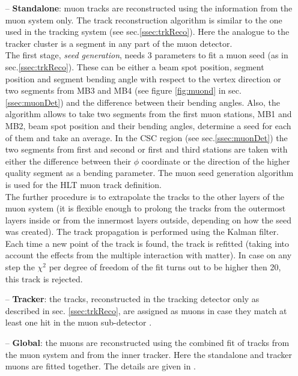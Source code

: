 \begin{itemize}
 \item [--] \textbf{Standalone}: muon tracks are reconstructed using the information from the muon system only. The track reconstruction
 algorithm \cite{TWiki:GlobalMuon} is similar to the one used in the tracking system (see sec.\ref{ssec:trkReco}). Here the analogue to the
 tracker cluster is a segment in any part of the muon detector.
 \\
 The first stage, \textit{seed generation}, needs 3 parameters to fit a muon seed (as in sec.\ref{ssec:trkReco}). These can be either a beam spot position, segment position and segment
 bending angle with respect to the vertex direction or two segments from MB3 and MB4 (see figure \ref{fig:muond} in sec.\ref{ssec:muonDet}) and the difference
 between their bending angles. Also, the algorithm allows to take two segments from the first muon stations, MB1 and MB2, beam spot position and their
 bending angles, determine a seed for each of them and take an average. In the CSC region (see sec.\ref{ssec:muonDet}) the two segments from first and second
 or first and third stations are taken with either the difference between their $\phi$ coordinate or the direction of the higher quality segment as a bending parameter.
 The muon seed generation algorithm is used for the HLT muon track definition.
 \\
 The further procedure is to extrapolate the tracks to the other layers of the muon system (it is flexible enough to prolong the tracks from the outermost layers inside or
 from the innermost layers outside, depending on how the seed was created). The track propagation is performed using the Kalman filter. Each time a new point of the 
 track is found, the track is refitted (taking into account the effects from the multiple interaction with matter). In case on any step the $\chi^2$ per degree of freedom 
 of the fit turns out to be higher then 20, this track is rejected. 
 
 \item [--] \textbf{Tracker}: the tracks, reconstructed in the tracking detector only as described in sec. \ref{ssec:trkReco}, 
 are assigned as muons in case they match at least one hit in the muon sub-detector \cite{TWiki:GlobalMuon}.
 
 \item [--] \textbf{Global}: the muons are reconstructed using 
 the combined fit of tracks from the muon system and from the inner tracker. Here the standalone and tracker muons are fitted together. The details are given
 in \cite{TWiki:GlobalMuon}.
\end{itemize}

